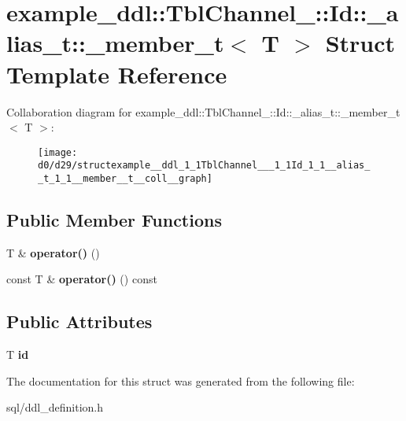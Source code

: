\hypertarget{structexample__ddl_1_1TblChannel___1_1Id_1_1__alias__t_1_1__member__t}{}\section{example\+\_\+ddl\+:\+:Tbl\+Channel\+\_\+\+:\+:Id\+:\+:\+\_\+alias\+\_\+t\+:\+:\+\_\+member\+\_\+t$<$ T $>$ Struct Template Reference}
\label{structexample__ddl_1_1TblChannel___1_1Id_1_1__alias__t_1_1__member__t}


Collaboration diagram for example\+\_\+ddl\+:\+:Tbl\+Channel\+\_\+\+:\+:Id\+:\+:\+\_\+alias\+\_\+t\+:\+:\+\_\+member\+\_\+t$<$ T $>$\+:
\nopagebreak
\begin{figure}[H]
\begin{center}
\leavevmode
\texttt{[image: d0/d29/structexample\_\_ddl\_1\_1TblChannel\_\_\_1\_1Id\_1\_1\_\_alias\_\_t\_1\_1\_\_member\_\_t\_\_coll\_\_graph]}
\end{center}
\end{figure}
\subsection*{Public Member Functions}
\begin{DoxyCompactItemize}
\item 
\hypertarget{structexample__ddl_1_1TblChannel___1_1Id_1_1__alias__t_1_1__member__t_a0e9b5dc6a5888bf774738f57d541f059}{}T \& {\bfseries operator()} ()\label{structexample__ddl_1_1TblChannel___1_1Id_1_1__alias__t_1_1__member__t_a0e9b5dc6a5888bf774738f57d541f059}

\item 
\hypertarget{structexample__ddl_1_1TblChannel___1_1Id_1_1__alias__t_1_1__member__t_a596a016099b67f7e9a9bbc78c7b096cf}{}const T \& {\bfseries operator()} () const \label{structexample__ddl_1_1TblChannel___1_1Id_1_1__alias__t_1_1__member__t_a596a016099b67f7e9a9bbc78c7b096cf}

\end{DoxyCompactItemize}
\subsection*{Public Attributes}
\begin{DoxyCompactItemize}
\item 
\hypertarget{structexample__ddl_1_1TblChannel___1_1Id_1_1__alias__t_1_1__member__t_a6b74a21f6070a6cc9fd44857d036b32e}{}T {\bfseries id}\label{structexample__ddl_1_1TblChannel___1_1Id_1_1__alias__t_1_1__member__t_a6b74a21f6070a6cc9fd44857d036b32e}

\end{DoxyCompactItemize}


The documentation for this struct was generated from the following file\+:\begin{DoxyCompactItemize}
\item 
sql/ddl\+\_\+definition.\+h\end{DoxyCompactItemize}
